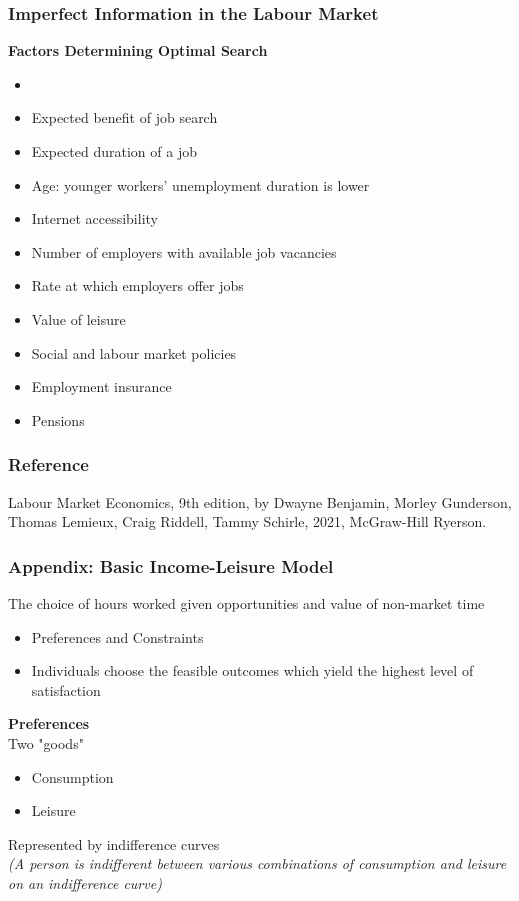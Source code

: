 \documentclass[blue]{beamer}
\begin{document}
 \begin{frame} \frametitle{Imperfect Information in the Labour Market}
\label{imperfect info and labour market}

\textbf{Factors Determining Optimal Search}
\begin{itemize}
\item[]
\item Expected benefit of job search
\item Expected duration of a job
\item Age: younger workers' unemployment duration is lower
\item Internet accessibility
\item Number of employers with available job vacancies
\item Rate at which employers offer jobs
\item Value of leisure
\item Social and labour market policies
\item Employment insurance
\item Pensions

\end{itemize}
 \end{frame}

 \begin{frame} \frametitle{Reference}
\label{Reference}

Labour Market Economics, 9th edition, by Dwayne Benjamin, Morley Gunderson, Thomas Lemieux, Craig Riddell, Tammy Schirle, 2021, McGraw-Hill Ryerson.
 \end{frame}



 \begin{frame} \frametitle{Appendix: Basic Income-Leisure Model}
\label{Appendix}

The choice of hours worked given opportunities and value of non-market time
\begin{itemize}
\item Preferences and Constraints
\item Individuals choose the feasible outcomes which yield the highest level of satisfaction
\end{itemize}

\textbf{Preferences}\\

Two "goods"
\begin{itemize}
\item Consumption
\item Leisure
\end{itemize}

Represented by indifference curves\\

\textit{	(A person is indifferent between various combinations of consumption and leisure on an indifference curve)}
 \end{frame}
 
\end{document}
